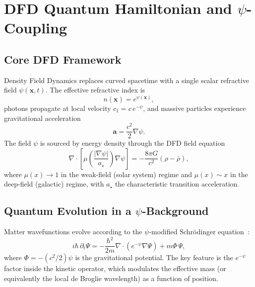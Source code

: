 \documentclass[aps,prd,twocolumn,superscriptaddress,nofootinbib]{revtex4-2}
\begin{document}
\section{DFD Quantum Hamiltonian and $\psi$-Coupling}\label{sec:dfd-quantum}

\subsection{Core DFD Framework}

Density Field Dynamics replaces curved spacetime with a single scalar
refractive field $\psi(\mathbf{x},t)$. The effective refractive index is
\begin{equation}
n(\mathbf{x}) = e^{\psi(\mathbf{x})},
\end{equation}
photons propagate at local velocity $c_1 = c\,e^{-\psi}$, and massive
particles experience gravitational acceleration
\begin{equation}\label{eq:dfd-accel}
\mathbf{a} = \frac{c^2}{2}\nabla\psi.
\end{equation}
The field $\psi$ is sourced by energy density through the DFD field
equation
\begin{equation}\label{eq:dfd-field}
\nabla\cdot\!\left[\mu\!\left(\frac{|\nabla\psi|}{a_\star}\right)
\nabla\psi\right] = -\frac{8\pi G}{c^2}(\rho - \bar{\rho}),
\end{equation}
where $\mu(x) \to 1$ in the weak-field (solar system) regime and
$\mu(x) \sim x$ in the deep-field (galactic) regime, with $a_\star$
the characteristic transition acceleration.

\subsection{Quantum Evolution in a $\psi$-Background}

Matter wavefunctions evolve according to the $\psi$-modified
Schr\"odinger equation~\cite{Alcock2025Penrose}:
\begin{equation}\label{eq:psi-schrodinger}
i\hbar\,\partial_t\Psi = -\frac{\hbar^2}{2m}\nabla\cdot
\!\left(e^{-\psi}\nabla\Psi\right) + m\Phi\,\Psi,
\end{equation}
where $\Phi = -(c^2/2)\psi$ is the gravitational potential. The key
feature is the $e^{-\psi}$ factor inside the kinetic operator, which
modulates the effective mass (or equivalently the local de Broglie
wavelength) as a function of position.
\end{document}
